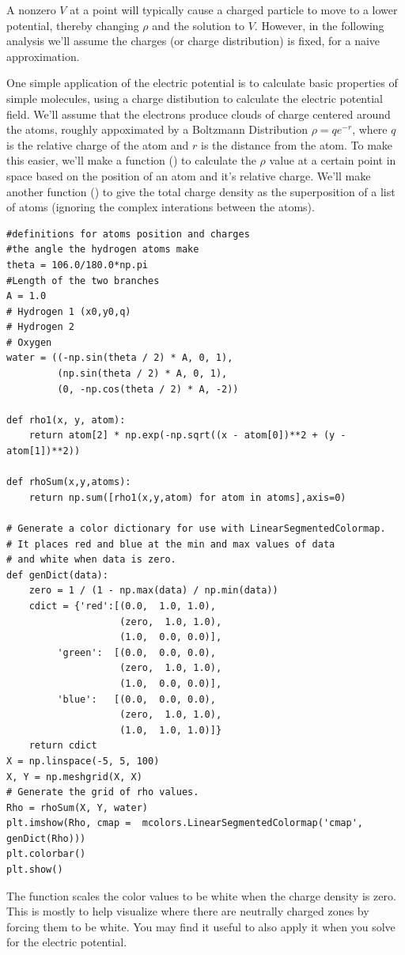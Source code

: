 A nonzero $V$ at a point will typically cause a charged particle to move to a lower potential,
thereby changing $\rho$ and the solution to $V$.
However, in the following analysis we'll assume the charges (or charge distribution) is fixed, for a naive approximation.

One simple application of the electric potential is to calculate basic properties of simple molecules, using a charge distibution to calculate the electric potential field.
We'll assume that the electrons produce clouds of charge centered around the atoms, roughly appoximated by a Boltzmann Distribution $\rho = q e^{-r}$, where $q$ is the relative charge of the atom and $r$ is the distance from the atom. 
To make this easier, we'll make a function () to calculate the $\rho$ value at a certain point in space based on the position of an atom and it's relative charge. 
We'll make another function () to give the total charge density as the superposition of a list of atoms (ignoring the complex interations between the atoms).

\begin{lstlisting}
#definitions for atoms position and charges
#the angle the hydrogen atoms make
theta = 106.0/180.0*np.pi
#Length of the two branches
A = 1.0
# Hydrogen 1 (x0,y0,q)
# Hydrogen 2 
# Oxygen
water = ((-np.sin(theta / 2) * A, 0, 1),
         (np.sin(theta / 2) * A, 0, 1),
         (0, -np.cos(theta / 2) * A, -2))

def rho1(x, y, atom):
    return atom[2] * np.exp(-np.sqrt((x - atom[0])**2 + (y - atom[1])**2))

def rhoSum(x,y,atoms):
    return np.sum([rho1(x,y,atom) for atom in atoms],axis=0)

# Generate a color dictionary for use with LinearSegmentedColormap.
# It places red and blue at the min and max values of data
# and white when data is zero.
def genDict(data):
    zero = 1 / (1 - np.max(data) / np.min(data))
    cdict = {'red':[(0.0,  1.0, 1.0),
                   	(zero,  1.0, 1.0),
                   	(1.0,  0.0, 0.0)],
         'green':  [(0.0,  0.0, 0.0),
                   	(zero,  1.0, 1.0),
                   	(1.0,  0.0, 0.0)],
         'blue':   [(0.0,  0.0, 0.0),
                   	(zero,  1.0, 1.0),
                   	(1.0,  1.0, 1.0)]}
    return cdict
X = np.linspace(-5, 5, 100)
X, Y = np.meshgrid(X, X)
# Generate the grid of rho values.
Rho = rhoSum(X, Y, water)
plt.imshow(Rho, cmap =  mcolors.LinearSegmentedColormap('cmap', genDict(Rho)))
plt.colorbar()
plt.show()
\end{lstlisting}
The function  scales the color values to be white when the charge density is zero.
This is mostly to help visualize where there are neutrally charged zones by forcing them to be white.
You may find it useful to also apply it when you solve for the electric  potential.

